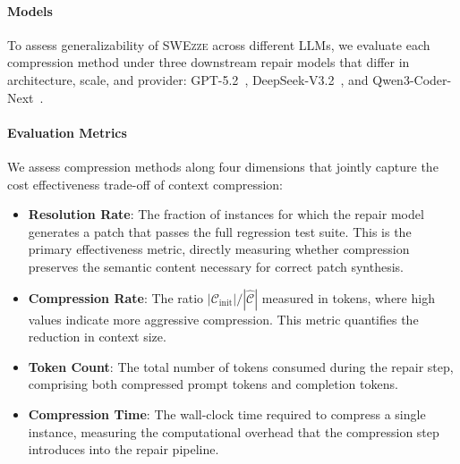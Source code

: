 \documentclass[sigconf,nonacm]{acmart}
\newcommand{\projName}{\textsc{SWEzze}\xspace}
\begin{document}
\paragraph*{Models} To assess generalizability of \projName across different LLMs, we evaluate each compression method under three downstream repair models that differ in architecture, scale, and provider: GPT-5.2~\cite{singh2025openai}, DeepSeek-V3.2~\cite{liu2024deepseek}, and Qwen3-Coder-Next~\cite{cao2026qwen3}.


\paragraph*{Evaluation Metrics} We assess compression methods along four dimensions that jointly capture the cost effectiveness trade-off of context compression:

\begin{itemize}
    \item \textbf{Resolution Rate}: The fraction of instances for which the repair model generates a patch that passes the full regression test suite. This is the primary effectiveness metric, directly measuring whether compression preserves the semantic content necessary for correct patch synthesis.
    \item \textbf{Compression Rate}: The ratio $|\mathcal{C}_\mathrm{init}| /|\hat{\mathcal{C}}| $ measured in tokens, where high values indicate more aggressive compression.  This metric quantifies the reduction in context size.
    \item \textbf{Token Count}: The total number of tokens consumed during the repair step, comprising both compressed prompt tokens and completion tokens. 
    \item \textbf{Compression Time}: The wall-clock time required to compress a single instance, measuring the computational overhead that the compression step introduces into the repair pipeline.
\end{itemize}

\end{document}
